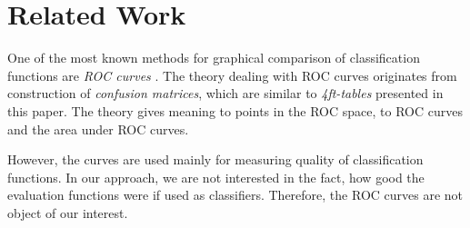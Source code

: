 \section{Related Work} \label{RelatedWork}

One of the most known methods for graphical comparison of classification functions are \emph{ROC curves} \cite{Faw}. The theory dealing with ROC curves originates from construction of \emph{confusion matrices}, which are similar to \emph{4ft-tables} presented in this paper. The theory gives meaning to points in the ROC space, to ROC curves and the area under ROC curves. 

However, the curves are used mainly for measuring quality of classification functions. In our approach, we are not interested in the fact, how good the evaluation functions were if used as classifiers. Therefore, the ROC curves are not object of our interest.